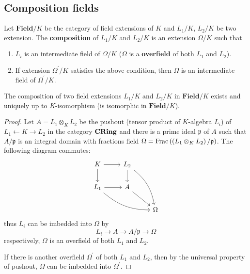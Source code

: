 \subsection{Composition fields} %

\begin{definition}
    Let $\mathbf{Field}/K$ be the category of field extensions of $K$ and $L_1/K$, $L_2/K$ be two extension. The \textbf{composition} of $L_1/K$ and $L_2/K$ is an extension $\Omega/K$ such that
    \begin{enumerate}[label=(\roman*)]
        \item
              $L_i$ is an intermediate field of $\Omega/K$ ($\Omega$ is a \textbf{overfield} of both $L_1$ and $L_2$).
        \item
              If extension $\Omega^\prime/K$ satisfies the above condition, then $\Omega$ is an intermediate field of $\Omega^\prime/K$.
    \end{enumerate}
\end{definition}





\begin{theorem}
    \label{thm:Existence of composition fields}
    The composition of two field extensions $L_1/K$ and $L_2/K$ in $\mathbf{Field}/K$ exists and uniquely up to $K$-isomorphism (is isomorphic in $\mathbf{Field}/K$).
    \begin{proof}
        Let $A=L_1\otimes_K L_2$ be the pushout
        (tensor product of $K$-algebra $L_i$) of $L_1\leftarrow K \rightarrow L_2$ in the category $\mathbf{CRing}$ and there is a prime ideal $\mathfrak{p}$ of $A$ such that $A/\mathfrak{p}$ is an integral domain with fractions field $\Omega=\operatorname{Frac}\left(\left(L_1\otimes_K L_2\right)/\mathfrak{p}\right)$. The following diagram commutes:
        \begin{equation*}
            \begin{tikzcd}
                K \arrow[r,""] \arrow[d,""'] & L_2\arrow[ddr,bend left=20,""] \arrow[d,""]& \\
                L_1 \arrow[rrd,bend right=20,""]\arrow[r,""'] & A \arrow[rd,""]&\\
                && \Omega
            \end{tikzcd}
        \end{equation*}
        thus $L_i$ can be imbedded into $\Omega$  by
        \begin{equation*}
            L_i\rightarrow A\rightarrow A/\mathfrak{p}\rightarrow \Omega
        \end{equation*}
        respectively, $\Omega$ is an overfield of both $L_1$ and $L_2$.

        If there is another overfield $\Omega^\prime$ of both $L_1$ and $L_2$, then by the universal property of pushout, $\Omega$ can be imbedded into $\Omega^\prime$.
    \end{proof}
\end{theorem}

